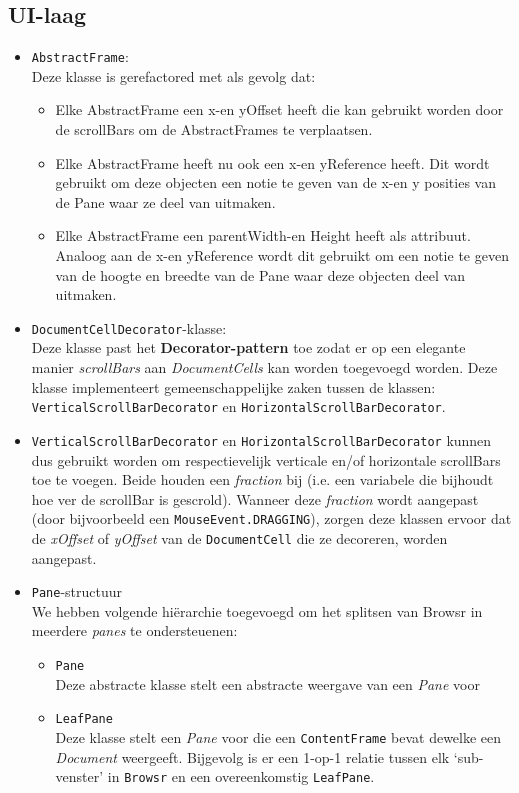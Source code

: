 \documentclass[12pt]{article}
\begin{document}
\subsection{UI-laag}
\begin{itemize}
	\item \texttt{AbstractFrame}:\\
	Deze klasse is gerefactored met als gevolg dat:
	\begin{itemize}
		\item Elke AbstractFrame een x-en yOffset heeft die kan gebruikt worden door de scrollBars om de AbstractFrames te verplaatsen.
		\item Elke AbstractFrame heeft nu ook een x-en yReference heeft. Dit wordt gebruikt om deze objecten een notie te geven van de x-en y posities van de Pane waar ze deel van uitmaken.
		\item Elke AbstractFrame een parentWidth-en Height heeft als attribuut. Analoog aan de x-en yReference wordt dit gebruikt om een notie te geven van de hoogte en breedte van de Pane waar deze objecten deel van uitmaken.
	\end{itemize}
	
	\item \texttt{DocumentCellDecorator}-klasse:\\
	Deze klasse past het \textbf{Decorator-pattern} toe zodat er op een elegante manier \textit{scrollBars} aan \textit{DocumentCells} kan worden toegevoegd worden. Deze klasse implementeert gemeenschappelijke zaken tussen de klassen: \texttt{VerticalScrollBarDecorator} en \texttt{HorizontalScrollBarDecorator}.
	
	\item \texttt{VerticalScrollBarDecorator} en \texttt{HorizontalScrollBarDecorator} kunnen dus gebruikt worden om respectievelijk verticale en/of horizontale scrollBars toe te voegen. Beide houden een \textit{fraction} bij (i.e. een variabele die bijhoudt hoe ver de scrollBar is gescrold). Wanneer deze \textit{fraction} wordt aangepast (door bijvoorbeeld een \texttt{MouseEvent.DRAGGING}), zorgen deze klassen ervoor dat de \textit{xOffset} of \textit{yOffset} van de \texttt{DocumentCell} die ze decoreren, worden aangepast.
	
	\item \texttt{Pane}-structuur\\
	We hebben volgende hiërarchie toegevoegd om het splitsen van Browsr in meerdere \textit{panes} te ondersteuenen:
	\begin{itemize}
		\item \texttt{Pane}\\
		Deze abstracte klasse stelt een abstracte weergave van een \textit{Pane} voor 
		\item \texttt{LeafPane}\\
		Deze klasse stelt een \textit{Pane} voor die een \texttt{ContentFrame} bevat dewelke een \textit{Document} weergeeft. Bijgevolg is er een 1-op-1 relatie tussen elk `sub-venster' in \texttt{Browsr} en een overeenkomstig \texttt{LeafPane}.
		

\end{itemize}
\end{itemize}
\end{document}
